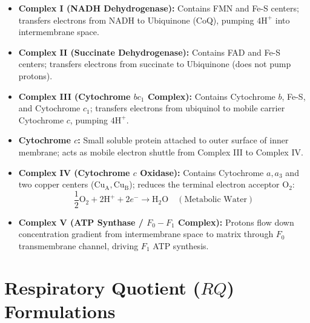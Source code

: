 \documentclass[10pt,twoside,openright]{book}
\begin{document}
\begin{conceptbox}
\begin{itemize}[leftmargin=*]
  \item \textbf{Complex I (NADH Dehydrogenase):} Contains FMN and Fe-S centers; transfers electrons from NADH to Ubiquinone (CoQ), pumping $4\mathrm{H}^+$ into intermembrane space.
  \item \textbf{Complex II (Succinate Dehydrogenase):} Contains FAD and Fe-S centers; transfers electrons from succinate to Ubiquinone (does not pump protons).
  \item \textbf{Complex III (Cytochrome $bc_1$ Complex):} Contains Cytochrome $b$, Fe-S, and Cytochrome $c_1$; transfers electrons from ubiquinol to mobile carrier Cytochrome $c$, pumping $4\mathrm{H}^+$.
  \item \textbf{Cytochrome $c$:} Small soluble protein attached to outer surface of inner membrane; acts as mobile electron shuttle from Complex III to Complex IV.
  \item \textbf{Complex IV (Cytochrome $c$ Oxidase):} Contains Cytochrome $a, a_3$ and two copper centers ($\mathrm{Cu_A, Cu_B}$); reduces the terminal electron acceptor $\mathrm{O}_2$:
  \begin{equation}
    \frac{1}{2}\mathrm{O_2} + 2\mathrm{H}^+ + 2e^- \longrightarrow \mathrm{H_2O} \quad (\text{Metabolic Water})
  \end{equation}
  \item \textbf{Complex V (ATP Synthase / $F_0-F_1$ Complex):} Protons flow down concentration gradient from intermembrane space to matrix through $F_0$ transmembrane channel, driving $F_1$ ATP synthesis.
\end{itemize}
\end{conceptbox}

\section{Respiratory Quotient ($RQ$) Formulations}
\end{document}
